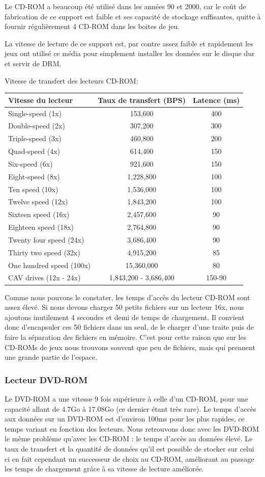\documentclass[a4paper, 11pt]{article} %
\begin{document}
Le CD-ROM a beaucoup été utilisé dans les années 90 et 2000, car le coût de fabrication de ce support est faible et ses capacité de stockage suffisantes, quitte à fournir régulièrement 4 CD-ROM dans les boites de jeu.

La vitesse de lecture de ce support est, par contre assez faible et rapidement les jeux ont utilisé ce média pour simplement installer les données sur le disque dur et servir de DRM.

\newpage
Vitesse de transfert des lecteurs CD-ROM: \cite{hardware:cdromspeed}

\begin{tabular}{|l|c|c|}
  \hline
  Vitesse du lecteur & Taux de transfert (BPS) & Latence (ms)\\
  \hline
  Single-speed (1x)&153,600&400\\
	Double-speed (2x)&307,200&300\\
	Triple-speed (3x)&460,800&200\\
	Quad-speed (4x)&614,400&150\\
	Six-speed (6x)&921,600&150\\
	Eight-speed (8x)&1,228,800&100\\
	Ten speed (10x)&1,536,000&100\\
	Twelve speed (12x)&1,843,200&100\\
	Sixteen speed (16x)&2,457,600&90\\
	Eighteen speed (18x)&2,764,800&90\\
	Twenty four speed (24x)&3,686,400&90\\
	Thirty two speed (32x)&4,915,200&85\\
	One hundred speed (100x)&15,360,000&80\\
	CAV drives (12x - 24x)&1,843,200 - 3,686,400&150-90\\
  \hline
\end{tabular}

Comme nous pouvons le constater, les temps d'accès du lecteur CD-ROM sont assez élevé. Si nous devons charger 50 petits fichiers sur un lecteur 16x, nous ajoutons inutilement 4 secondes et demi de temps de chargement. Il convient donc d'encapsuler ces 50 fichiers dans un seul, de le charger d'une traite puis de faire la séparation des fichiers en mémoire.
C'est pour cette raison que sur les CD-ROMs de jeux nous trouvons souvent que peu de fichiers, mais qui prennent une grande partie de l'espace.

\subsubsection*{Lecteur DVD-ROM}
Le DVD-ROM a une vitesse 9 fois supérieure à celle d'un CD-ROM,\cite{hardware:dvdromspeed} pour une capacité allant de 4.7Go à 17.08Go (ce dernier étant très rare). Le temps d'accès aux données sur un DVD-ROM est d'environ 100ms pour les plus rapides, ce temps variant en fonction des lecteurs. Nous retrouvons donc avec les DVD-ROM le même problème qu'avec les CD-ROM : le temps d'accès au données élevé. Le taux de transfert et la quantité de données qu'il est possible de stocker sur celui ci en fait cependant un successeur de choix au CD-ROM, améliorant au passage les temps de chargement grâce à sa vitesse de lecture améliorée.
\end{document}
